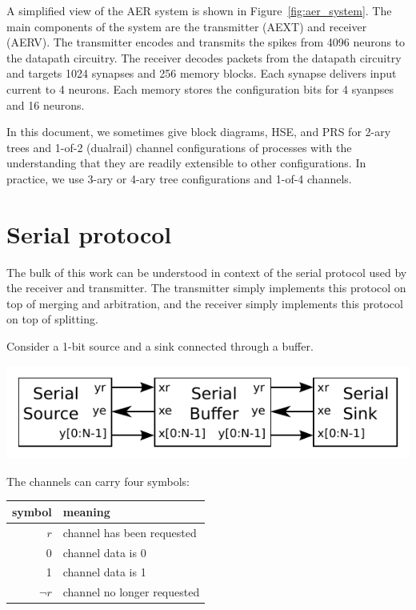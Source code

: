 \documentclass{article}
\begin{document}
A simplified view of the AER system is shown in Figure~\ref{fig:aer_system}.
The main components of the system are the transmitter (AEXT) and receiver (AERV).
The transmitter encodes and transmits the spikes from 4096 neurons to the 
datapath circuitry. The receiver decodes packets from the datapath circuitry 
and targets 1024 synapses and 256 memory blocks. Each synapse delivers input 
current to 4 neurons. Each memory stores the configuration bits for 4 syanpses 
and 16 neurons.

In this document, we sometimes give block diagrams, HSE, and PRS for 2-ary 
trees and 1-of-2 (dualrail) channel configurations of processes with the 
understanding that they are readily extensible to other configurations.
In practice, we use 3-ary or 4-ary tree configurations and 1-of-4 channels.

\section{Serial protocol}

The bulk of this work can be understood in context of the serial protocol
used by the receiver and transmitter. 
The transmitter simply implements this protocol on top of merging and arbitration, 
and the receiver simply implements this protocol on top of splitting.

Consider a 1-bit source and a sink connected through a buffer.

\begin{center}
    \includegraphics[width=.5\textwidth]{img/serial_protocol_block_diagram.pdf}
\end{center}

\noindent
The channels can carry four symbols:

\begin{center}
    \begin{tabular}{r|l}
    \hline
    symbol & meaning \\ \hline
    $r$ & channel has been requested \\
    0 & channel data is 0 \\
    1 & channel data is 1 \\
    $\neg r$ & channel no longer requested \\
    \hline
    \end{tabular}
\end{center}
\end{document}

